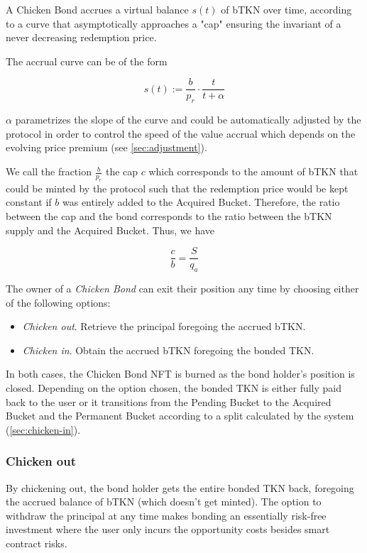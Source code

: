 \documentclass{article}
\begin{document}
A Chicken Bond accrues a virtual balance $s(t)$ of bTKN over time, according to a curve that asymptotically approaches a "cap" ensuring the invariant of a never decreasing redemption price.

The accrual curve can be of the form 

\begin{equation}
  \label{eq:accrual}
    s(t) := \frac{b}{p_r} \cdot \frac{t}{t+\alpha}
\end{equation}


$\alpha$ parametrizes the slope of the curve and could be automatically adjusted by the protocol in order to control the speed of the value accrual which depends on the evolving price premium (see \ref{sec:adjustment}).

We call the fraction $\frac{b}{p_r}$ the cap $c$ which corresponds to the amount of bTKN that could be minted by the protocol such that the redemption price would be kept constant if $b$ was entirely added to the Acquired Bucket. Therefore, the ratio between the cap and the bond corresponds to the ratio between the bTKN supply and the Acquired Bucket. Thus, we have

\begin{equation}
  \label{eq:cap-bond-ratio}
    \frac{c}{b} = \frac{S}{q_a}
\end{equation}   

The owner of a \textit{Chicken Bond} can exit their position any time by choosing either of the following options:

\begin{itemize}
    \item \textit{Chicken out}. Retrieve the principal foregoing the accrued bTKN.
    \item \textit{Chicken in}. Obtain the accrued bTKN foregoing the bonded TKN.
\end{itemize}

In both cases, the Chicken Bond NFT is burned as the bond holder’s position is closed. Depending on the option chosen, the bonded TKN is either fully paid back to the user or it transitions from the Pending Bucket to the Acquired Bucket and the Permanent Bucket according to a split calculated by the system (\ref{sec:chicken-in}). 

\subsubsection{Chicken out}
\label{sec:chicken-out}
By chickening out, the bond holder gets the entire bonded TKN back, foregoing the accrued balance of bTKN (which doesn’t get minted). The option to withdraw the principal at any time makes bonding an essentially risk-free investment where the user only incurs the opportunity costs besides smart contract risks.
\end{document}
